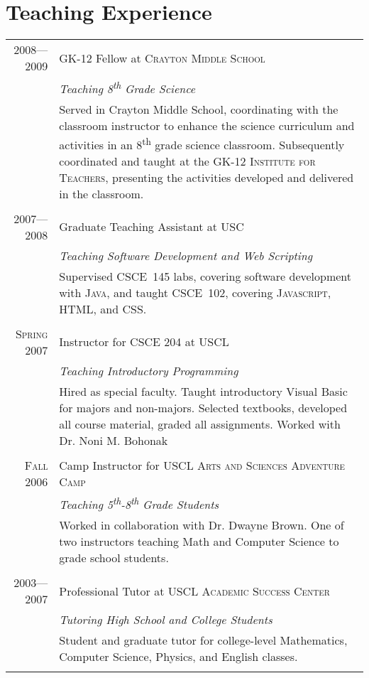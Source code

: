 \documentclass[a4paper,10pt]{article}
\begin{document}
\section{Teaching Experience}
\begin{tabular}{r|p{11cm}}
\textsc{2008---2009}
& GK-12 Fellow at \textsc{Crayton Middle School} \\
&\emph{Teaching 8\textsuperscript{th} Grade Science}\\
&\footnotesize{Served in Crayton Middle School, coordinating with the classroom instructor to enhance the science curriculum and activities in an 8\textsuperscript{th} grade science classroom. Subsequently coordinated and taught at the \textsc{GK-12 Institute for Teachers}, presenting the activities developed and delivered in the classroom.}
\\\multicolumn{2}{c}{} \\
\textsc{2007---2008} & Graduate Teaching Assistant at \textsc{USC} \\
&\emph{Teaching Software Development and Web Scripting}\\
&\footnotesize{Supervised CSCE~145 labs, covering software development with \textsc{Java}, and taught CSCE~102, covering \textsc{Javascript}, \textsc{HTML}, and \textsc{CSS}.}\\\multicolumn{2}{c}{} \\
\textsc{Spring 2007} &  Instructor for \textsc{CSCE 204} at \textsc{USCL} \\
&\emph{Teaching Introductory Programming}\\
&\footnotesize{Hired as special faculty. Taught introductory Visual Basic for majors and non-majors. Selected textbooks, developed all course material, graded all assignments. Worked with Dr. Noni M. Bohonak}\\\multicolumn{2}{c}{} \\
\textsc{Fall 2006} & Camp Instructor for \textsc{USCL Arts and Sciences Adventure Camp} \\
&\emph{Teaching 5\textsuperscript{th}-8\textsuperscript{th} Grade Students}\\
&\footnotesize{Worked in collaboration with Dr. Dwayne Brown. One of two instructors teaching Math and Computer Science to grade school students.}\\\multicolumn{2}{c}{} \\
\textsc{2003---2007} & Professional Tutor at \textsc{USCL Academic Success Center} \\
&\emph{Tutoring High School and College Students}\\
&\footnotesize{Student and graduate tutor for college-level Mathematics, Computer Science, Physics, and English classes.}\\\multicolumn{2}{c}{} \\
\end{tabular}
\end{document}
